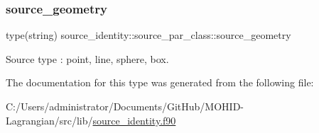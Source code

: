 \subsubsection{\texorpdfstring{source\+\_\+geometry}{source\_geometry}}
{\footnotesize\ttfamily type(string) source\+\_\+identity\+::source\+\_\+par\+\_\+class\+::source\+\_\+geometry\hspace{0.3cm}{\ttfamily [private]}}



Source type \+: \textquotesingle{}point\textquotesingle{}, \textquotesingle{}line\textquotesingle{}, \textquotesingle{}sphere\textquotesingle{}, \textquotesingle{}box\textquotesingle{}. 



The documentation for this type was generated from the following file\+:\begin{DoxyCompactItemize}
\item 
C\+:/\+Users/administrator/\+Documents/\+Git\+Hub/\+M\+O\+H\+I\+D-\/\+Lagrangian/src/lib/\mbox{\hyperlink{source__identity_8f90}{source\+\_\+identity.\+f90}}\end{DoxyCompactItemize}
